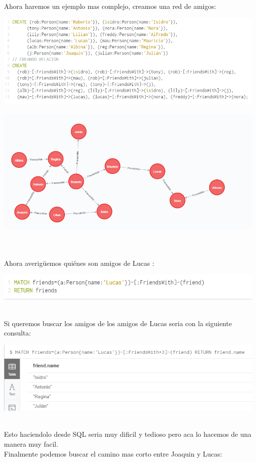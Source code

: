 \documentclass[twoside,onecolumn]{article}
\begin{document}
\begin{flushright}
\begin{itemize}
\textbf{}\\ Ahora haremos un ejemplo mas complejo, creamos una red de amigos:

\begin{center}
\includegraphics[scale=0.7]{Imagenes/neo4j6}
\end{center}	

\begin{center}
\includegraphics[scale=0.7]{Imagenes/neo4j8}
\end{center}	

\textbf{}\\
\textbf{}\\ Ahora averigüemos quiénes son amigos de Lucas :

\begin{center}
\includegraphics[scale=0.7]{Imagenes/neo4j9}
\end{center}	

\textbf{}\\Si queremos buscar los amigos de los amigos de Lucas seria con la siguiente consulta:

\begin{center}
\includegraphics[scale=0.7]{Imagenes/neo4j10}
\end{center}	
\textbf{}\\ Esto haciendolo desde SQL seria muy dificil y tedioso pero aca lo hacemos de una manera muy facil.
\textbf{}\\ Finalmente podemos buscar el camino mas corto entre Joaquin y Lucas:


\end{itemize}
\end{flushright}
\end{document}
